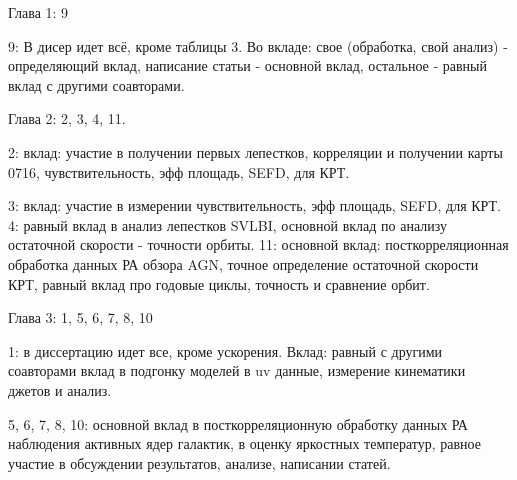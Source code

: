 \insertbiblioauthor

{\contribution}

Глава 1: 9

9: В дисер идет всё, кроме таблицы 3.
Во вкладе: свое (обработка, свой анализ) - определяющий вклад, написание статьи - основной вклад,
остальное - равный вклад  с другими соавторами.

Глава 2: 2, 3, 4, 11.

2: вклад: участие в получении первых лепестков, корреляции и получении карты 0716, чувствительность,
эфф площадь, SEFD, для КРТ.

3: вклад: участие в измерении чувствительность, эфф площадь, SEFD, для КРТ.
4: равный вклад в анализ лепестков SVLBI, основной вклад по анализу остаточной скорости - точности
орбиты.
11: основной вклад: посткорреляционная обработка данных РА обзора AGN, точное определение остаточной
скорости КРТ, равный вклад про годовые циклы, точность и сравнение орбит.

Глава 3: 1, 5, 6, 7, 8, 10

1: в диссертацию идет все, кроме ускорения.
Вклад: равный с другими соавторами вклад в подгонку моделей в uv данные, измерение кинематики джетов
и анализ.

5, 6, 7, 8, 10: основной вклад в посткорреляционную обработку данных РА наблюдения активных ядер
галактик, в оценку яркостных температур, равное участие в обсуждении результатов, анализе, написании
статей.



%
%
